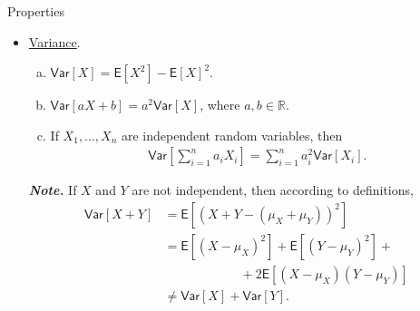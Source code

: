 \documentclass[hyperref={pdfpagelabels=false}]{beamer}
\newcommand{\R}{\mathbb{R}}
\newcommand{\U}{\mathsf}
\newcommand{\highlightr}[1]{\textcolor[rgb]{1,0.3,0.2}{\emph{\textbf{#1}}}}
\begin{document}
%
\begin{frame}{Properties}
    \begin{itemize}
    	\justifying
    	\item \underline{Variance}.
    	\begin{enumerate}[(a).]
    		\justifying
    		\item $\U{Var}[X] = \U{E}[X^2] - \U{E}[X]^2$.
    		\item $\U{Var}[aX + b] = a^2\U{Var}[X]$, where $a, b \in \R$.
    		\item If $X_1, \ldots, X_n$ are independent random variables, then 
    		\begin{align*}
    		    \U{Var}\left[\sum_{i=1}^n a_iX_i \right]  = \sum_{i=1}^n a_i^2\U{Var}[X_i].
    		\end{align*}
    	\end{enumerate}
    	\highlightr{Note.} If $X$ and $Y$ are not independent, then according to definitions,
    	\begin{align*}
        	\U{Var}[X + Y] & = \U{E}\left[\left(X + Y - (\mu_X + \mu_Y) \right)^2 \right] \\
        	& = \U{E}\left[(X-\mu_X)^2 \right] + \U{E}\left[(Y - \mu_Y)^2 \right] + \\
        	& \qquad \qquad \qquad + 2\U{E}\left[(X-\mu_X)(Y-\mu_Y) \right] \\
        	& \neq \U{Var}[X] + \U{Var}[Y].
    	\end{align*}
    \end{itemize}
\end{frame}
%
\end{document}
